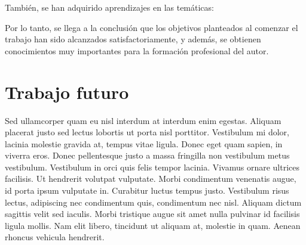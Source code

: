 \medskip

\noindent También, se han adquirido aprendizajes en las temáticas:


\medskip

Por lo tanto, se llega a la conclusión que los objetivos planteados al comenzar el trabajo han sido alcanzados satisfactoriamente, y además, se obtienen conocimientos muy importantes para la formación profesional del autor.


\section{Trabajo futuro}

Sed ullamcorper quam eu nisl interdum at interdum enim egestas. Aliquam placerat justo sed lectus lobortis ut porta nisl porttitor. Vestibulum mi dolor, lacinia molestie gravida at, tempus vitae ligula. Donec eget quam sapien, in viverra eros. Donec pellentesque justo a massa fringilla non vestibulum metus vestibulum. Vestibulum in orci quis felis tempor lacinia. Vivamus ornare ultrices facilisis. Ut hendrerit volutpat vulputate. Morbi condimentum venenatis augue, id porta ipsum vulputate in. Curabitur luctus tempus justo. Vestibulum risus lectus, adipiscing nec condimentum quis, condimentum nec nisl. Aliquam dictum sagittis velit sed iaculis. Morbi tristique augue sit amet nulla pulvinar id facilisis ligula mollis. Nam elit libero, tincidunt ut aliquam at, molestie in quam. Aenean rhoncus vehicula hendrerit.
